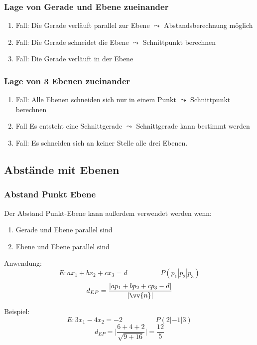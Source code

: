 \documentclass[a4paper, 15pt]{article}
\begin{document}
\subsubsection{Lage von Gerade und Ebene zueinander}
\begin{enumerate}
\item Fall: Die Gerade verläuft parallel zur Ebene\newline
$\leadsto$ Abstandsberechnung möglich
\item Fall: Die Gerade schneidet die Ebene\newline
$\leadsto$ Schnittpunkt berechnen
\item Fall: Die Gerade verläuft in der Ebene
\end{enumerate}
\subsubsection{Lage von 3 Ebenen zueinander}
\begin{enumerate}
\item Fall: Alle Ebenen schneiden sich nur in einem Punkt\newline
$\leadsto$ Schnittpunkt berechnen
\item Fall Es entsteht eine Schnittgerade\newline
$\leadsto$ Schnittgerade kann bestimmt werden
\item Fall: Es schneiden sich an keiner Stelle alle drei Ebenen.
\end{enumerate}
\subsection{Abstände mit Ebenen}
\subsubsection{Abstand Punkt Ebene}
Der Abstand Punkt-Ebene kann außerdem verwendet werden wenn:
\begin{enumerate}
\item Gerade und Ebene parallel sind
\item Ebene und Ebene parallel sind
\end{enumerate}
\begin{minipage}{.49\textwidth}
Anwendung:
\begin{equation*}
E:ax_1+bx_2+cx_3=d \hspace{2cm} P(p_1|p_2|p_3)
\end{equation*}
\begin{equation*}
d_{EP} = \dfrac{|ap_1+bp_2+cp_3-d|}{|\vv{n}|}
\end{equation*}
\end{minipage}
\begin{minipage}{.49\textwidth}
Beispiel:
\begin{equation*}
E: 3x_1-4x_2 = -2 \hspace{2cm} P(2|-1|3)
\end{equation*}
\begin{equation*}
d_{EP} = \Biggl|\dfrac{6+4+2}{\sqrt{9+16}}\Biggl| = \dfrac{12}{5}
\end{equation*}
\end{minipage}
\end{document}
